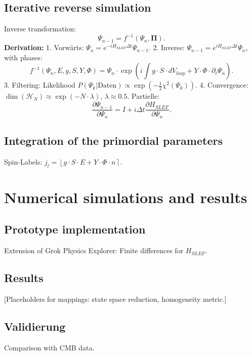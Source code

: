 \documentclass[11pt,a4paper]{article}
\begin{document}
	\subsection{Iterative reverse simulation}
	Inverse transformation:
	\begin{equation}
		\Psi_{n-1} = f^{-1}(\Psi_n, \mathbf{\Pi}).
	\end{equation}
	\textbf{Derivation:}  
	1. Vorwärts: $\Psi_n = e^{-i H_{SLEF} \Delta t} \Psi_{n-1}$.  
	2. Inverse: $\Psi_{n-1} = e^{i H_{SLEF} \Delta t} \Psi_n$, with phases:  
	\begin{equation}
		f^{-1}(\Psi_n, E, g, S, Y, \Phi) = \Psi_n \cdot \exp\left( i \int g \cdot S \cdot dV_{loop} + Y \cdot \Phi \cdot \partial_t \Psi_n \right).
	\end{equation}
	3. Filtering: Likelihood $P(\Psi_k | \text{Daten}) \propto \exp\left( -\frac{1}{2} \chi^2(\Psi_k) \right)$.  
	4. Convergence: $\dim(\mathcal{H}_N) \approx \exp(-N \cdot \lambda)$, $\lambda \approx 0.5$. Partielle:  
	\begin{equation}
		\frac{\partial \Psi_{n-1}}{\partial \Psi_n} = I + i \Delta t \frac{\partial H_{SLEF}}{\partial \Psi_n}.
	\end{equation}
	
	\subsection{Integration of the primordial parameters}
	Spin-Labels: $j_l = \left\lfloor g \cdot S \cdot E + Y \cdot \Phi \cdot n \right\rceil$.
	
	\section{Numerical simulations and results}
	
	\subsection{Prototype implementation}
	Extension of Grok Physics Explorer: Finite differences for $H_{SLEF}$.
	
	\subsection{Results}
	[Placeholders for mappings: state space reduction, homogeneity metric.]
	
	\subsection{Validierung}
	Comparison with CMB data.
	
\end{document}
